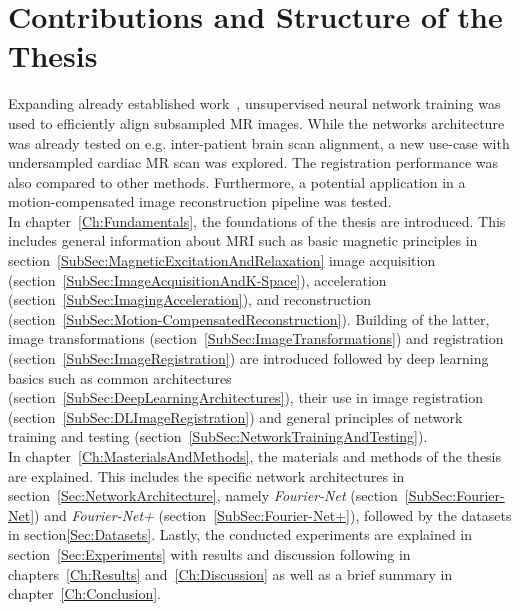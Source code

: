 \section{Contributions and Structure of the Thesis} \label{Sec:ContributionsAndStructure}
Expanding already established work~\cite{Fourier-Net,Fourier-Net+}, unsupervised neural network training was used to efficiently align subsampled MR images. While the networks architecture was already tested on e.g. inter-patient brain scan alignment, a new use-case with undersampled cardiac MR scan was explored. The registration performance was also compared to other methods. Furthermore, a  potential application in a motion-compensated image reconstruction pipeline was tested.\\
In chapter~\ref{Ch:Fundamentals}, the foundations of the thesis are introduced. This includes general information about MRI such as basic magnetic principles in section~\ref{SubSec:MagneticExcitationAndRelaxation} image acquisition (section~\ref{SubSec:ImageAcquisitionAndK-Space}), acceleration (section~\ref{SubSec:ImagingAcceleration}), and reconstruction (section~\ref{SubSec:Motion-CompensatedReconstruction}). Building of the latter, image transformations (section~\ref{SubSec:ImageTransformations}) and registration (section~\ref{SubSec:ImageRegistration}) are introduced followed by deep learning basics such as common architectures (section~\ref{SubSec:DeepLearningArchitectures}), their use in image registration (section~\ref{SubSec:DLImageRegistration}) and general principles of network training and testing (section~\ref{SubSec:NetworkTrainingAndTesting}).\\
In chapter~\ref{Ch:MasterialsAndMethods}, the materials and methods of the thesis are explained. This includes the specific network architectures in section~\ref{Sec:NetworkArchitecture}, namely \emph{Fourier-Net} (section~\ref{SubSec:Fourier-Net}) and \emph{Fourier-Net+} (section~\ref{SubSec:Fourier-Net+}), followed by the datasets in section\ref{Sec:Datasets}.
Lastly, the conducted experiments are explained in section~\ref{Sec:Experiments} with results and discussion following in chapters~\ref{Ch:Results} and~\ref{Ch:Discussion} as well as a brief summary in chapter~\ref{Ch:Conclusion}.
